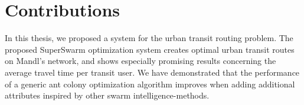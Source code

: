 \section{Contributions}


%

In this thesis, we proposed a system for the urban transit routing problem. The proposed SuperSwarm optimization system creates optimal urban transit routes on Mandl's network\citep{mandl79}, and shows especially promising results concerning the average travel time per transit user. We have demonstrated that the performance of a generic ant colony optimization algorithm improves when adding additional attributes inspired by other swarm intelligence-methods. %


